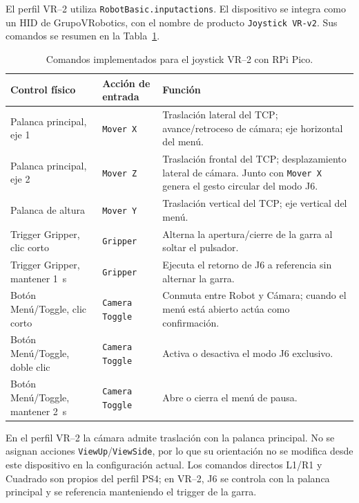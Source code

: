 El perfil VR--2 utiliza \texttt{RobotBasic.inputactions}. El dispositivo se
integra como un HID de GrupoVRobotics, con el nombre de producto
\texttt{Joystick VR-v2}. Sus comandos se resumen en la
Tabla~\ref{tab:vr2_commands}.

\begin{table}[H]
\centering
\small
\setlength{\tabcolsep}{4pt}
\renewcommand{\arraystretch}{1.18}
\caption{Comandos implementados para el joystick VR--2 con RPi Pico.}
\label{tab:vr2_commands}
\begin{tabular}{p{3.2cm}p{3.5cm}p{8.9cm}}
\hline
\textbf{Control físico} & \textbf{Acción de entrada} & \textbf{Función} \\
\hline
Palanca principal, eje 1 & \texttt{Mover X} & Traslación lateral del TCP; avance/retroceso de cámara; eje horizontal del menú. \\
Palanca principal, eje 2 & \texttt{Mover Z} & Traslación frontal del TCP; desplazamiento lateral de cámara. Junto con \texttt{Mover X} genera el gesto circular del modo J6. \\
Palanca de altura & \texttt{Mover Y} & Traslación vertical del TCP; eje vertical del menú. \\
Trigger Gripper, clic corto & \texttt{Gripper} & Alterna la apertura/cierre de la garra al soltar el pulsador. \\
Trigger Gripper, mantener \SI{1}{\second} & \texttt{Gripper} & Ejecuta el retorno de J6 a referencia sin alternar la garra. \\
Botón Menú/Toggle, clic corto & \texttt{Camera Toggle} & Conmuta entre Robot y Cámara; cuando el menú está abierto actúa como confirmación. \\
Botón Menú/Toggle, doble clic & \texttt{Camera Toggle} & Activa o desactiva el modo J6 exclusivo. \\
Botón Menú/Toggle, mantener \SI{2}{\second} & \texttt{Camera Toggle} & Abre o cierra el menú de pausa. \\
\hline
\end{tabular}
\end{table}

En el perfil VR--2 la cámara admite traslación con la palanca principal. No se
asignan acciones \texttt{ViewUp}/\texttt{ViewSide}, por lo que su orientación no
se modifica desde este dispositivo en la configuración actual. Los comandos
directos L1/R1 y Cuadrado son propios del perfil PS4; en VR--2, J6 se controla con
la palanca principal y se referencia manteniendo el trigger de la garra.

